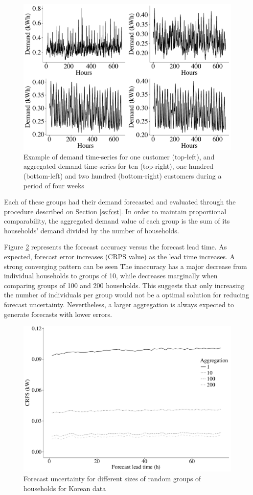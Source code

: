 \documentclass[preprint,3p,12pt,authoryear]{elsarticle}
\begin{document}
\begin{figure}
  \centering
  \includegraphics[width=0.8\columnwidth]{2017-10-13_compare_aggrdemands}
  \caption{Example of demand time-series for one customer (top-left), and aggregated demand time-series for ten (top-right), one hundred (bottom-left) and two hundred (bottom-right) customers during a period of four weeks}
  \label{fig:4weeksaggr}
\end{figure}

Each of these groups had their demand forecasted and evaluated through the procedure described on Section \ref{ss:fcst}.
In order to maintain proportional comparability, the aggregated demand value of each group is the sum of its households' demand divided by the number of households.

Figure \ref{fig:rndgrp} represents the forecast accuracy versus the forecast lead time.
As expected, forecast error increases (CRPS value) as the lead time increases.
A strong converging pattern can be seen
The inaccuracy has a major decrease from individual households to groups of 10, while decreases marginally when comparing groups of 100 and 200 households.
This suggests that only increasing the number of individuals per group would not be a optimal solution for reducing forecast uncertainty.
Nevertheless, a larger aggregation is always expected to generate forecasts with lower errors.

\begin{figure}
  \centering
  \includegraphics[width=0.8\columnwidth]{2017-10-13_rndgrp}
  \caption{Forecast uncertainty for different sizes of random groups of households for Korean data}
  \label{fig:rndgrp}
\end{figure}
\end{document}
